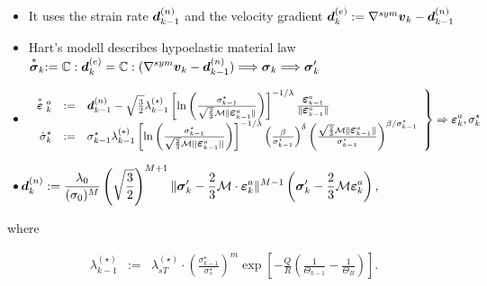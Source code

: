 \documentclass[12pt,a4paper]{scrbook}
\begin{document}
\begin{minipage}[c]{13cm}
\begin{itemize}
\item It uses the strain rate $\mbox{\boldmath$d$}^{(n)}_{k-1}$ and the velocity gradient $\mbox{\boldmath$d$}^{(e)}_{k}:=\nabla^{sym} \mbox{\boldmath$v$}_{k}-\mbox{\boldmath$d$}^{(n)}_{k-1}$
\item Hart's modell describes hypoelastic material law $\displaystyle\stackrel{*}{\mbox{\boldmath$\sigma$}}_{k}:={\mathbb C}:\mbox{\boldmath$d$}^{(e)}_k={\mathbb C}:(\nabla^{sym} \mbox{\boldmath$v$}_{k}-\mbox{\boldmath$d$}^{(n)}_{k-1})\Longrightarrow \mbox{\boldmath$\sigma$}_{k}\Longrightarrow \mbox{\boldmath$\sigma$}'_{k}$

\item 
\begin{equation*}
\left.
\begin{array}{rcl}
\displaystyle\stackrel{*}{\mbox{\boldmath$\varepsilon$}}{}^{a}_{k}
&:=&\mbox{\boldmath$d$}^{(n)}_{k-1}-\sqrt{\frac{3}{2}}\lambda^{(\star)}_{k-1}\left[\ln\left( \frac{\sigma^{\star}_{k-1}}{\sqrt{\frac{2}{3}}\mathcal{M}\|\mbox{\boldmath$\varepsilon$}^{a}_{k-1}\|}\right)  \right]^{-1/\lambda}\frac{\mbox{\boldmath$\varepsilon$}^{a}_{k-1}}{\|\mbox{\boldmath$\varepsilon$}^{a}_{k-1}\|}
\\
\displaystyle\dot{\sigma}^{\star}_{k}&:=&\sigma^{\star}_{k-1}\lambda^{(\star)}_{k-1}\left[\ln\left( \frac{\sigma^{\star}_{k-1}}{\sqrt{\frac{2}{3}}\mathcal{M}\vert\vert\mbox{\boldmath$\varepsilon$}^{a}_{k-1}\vert\vert}\right)  \right]^{-1/\lambda}\left( \frac{\beta}{\sigma^{\star}_{k-1}}\right) ^{\delta}\left(\frac{\sqrt{\frac{2}{3}}\mathcal{M}\|\mbox{\boldmath$\varepsilon$}^{a}_{k-1}\|}{\sigma^{\star}_{k-1}} \right) ^{\beta/\sigma^{\star}_{k-1}}
\end{array}
\right\}
\Rightarrow \mbox{\boldmath$\varepsilon$}^{a}_{k}, \sigma^{\star}_{k}
\end{equation*} 

\item
\begin{equation*}
\hspace*{-25mm}\bv{d}^{(n)}_{k}
:=\frac{\lambda_{0}}{(\sigma_{0})^{M}}\left( \sqrt{\frac{3}{2}}\right)^{M+1} \|\bv{\sigma}'_{k}-\frac{2}{3}\mathcal{M}\cdot\bv{\e}^{a}_{k}\|^{M-1}\left( \bv{\sigma}'_{k}-\frac{2}{3}\mathcal{M}\bv{\e}^{a}_{k}\right),\nonumber
\end{equation*} 

\end{itemize}
where

\begin{eqnarray}\lambda^{(\star)}_{k-1}&:=&\lambda_{sT}^{(\star)}\cdot\left( \frac{\sigma^{\star}_{k-1}}{\sigma_{s}^{\star}}\right)^{m}\exp\left[ -\frac{Q}{R}\left( \frac{1}{\Theta_{k-1}}-\frac{1}{\Theta_{B}}\right) \right].\nonumber
\end{eqnarray} 
\end{minipage}
\end{document}
